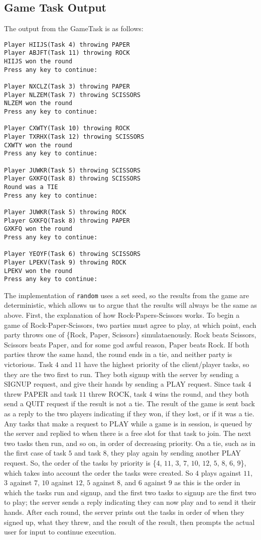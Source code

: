 \documentclass[12pt]{article}
\begin{document}
\subsection{Game Task Output}
The output from the GameTask is as follows:
\begin{verbatim}
Player HIIJS(Task 4) throwing PAPER
Player ABJFT(Task 11) throwing ROCK
HIIJS won the round
Press any key to continue:

Player NXCLZ(Task 3) throwing PAPER
Player NLZEM(Task 7) throwing SCISSORS
NLZEM won the round
Press any key to continue:

Player CXWTY(Task 10) throwing ROCK
Player TXRHX(Task 12) throwing SCISSORS
CXWTY won the round
Press any key to continue:

Player JUWKR(Task 5) throwing SCISSORS
Player GXKFQ(Task 8) throwing SCISSORS
Round was a TIE
Press any key to continue:

Player JUWKR(Task 5) throwing ROCK
Player GXKFQ(Task 8) throwing PAPER
GXKFQ won the round
Press any key to continue:

Player YEOYF(Task 6) throwing SCISSORS
Player LPEKV(Task 9) throwing ROCK
LPEKV won the round
Press any key to continue:
\end{verbatim}
The implementation of \texttt{random} uses a set seed, so the results from the game are deterministic, which allows us to argue that the results will always be the same as above.  First, the explanation of how Rock-Papers-Scissors works.  To begin a game of Rock-Paper-Scissors, two parties must agree to play, at which point, each party throws one of \{Rock, Paper, Scissors\} simulataenously.  Rock beats Scissors, Scissors beats Paper, and for some god awful reason, Paper beats Rock.  If both parties throw the same hand, the round ends in a tie, and neither party is victorious.  Task $4$ and $11$ have the highest priority of the client/player tasks, so they are the two first to run.  They both signup with the server by sending a SIGNUP request, and give their hands by sending a PLAY request.  Since task $4$ threw PAPER and task $11$ threw ROCK, task $4$ wins the round, and they both send a QUIT request if the result is not a tie.  The result of the game is sent back as a reply to the two players indicating if they won, if they lost, or if it was a tie.  Any tasks that make a request to PLAY while a game is in session, is queued by the server and replied to when there is a free slot for that task to join.  The next two tasks then run, and so on, in order of decreasing priority.  On a tie, such as in the first case of task $5$ and task $8$, they play again by sending another PLAY request.  So, the order of the tasks by priority is \{$4$, $11$, $3$, $7$, $10$, $12$, $5$, $8$, $6$, $9$\}, which takes into account the order the tasks were created.  So $4$ plays against $11$, $3$ against $7$, $10$ against $12$, $5$ against $8$, and $6$ against $9$ as this is the order in which the tasks run and signup, and the first two tasks to signup are the first two to play; the server sends a reply indicating they can now play and to send it their hands.  After each round, the server prints out the tasks in order of when they signed up, what they threw, and the result of the result, then prompts the actual user for input to continue execution.
\end{document}
